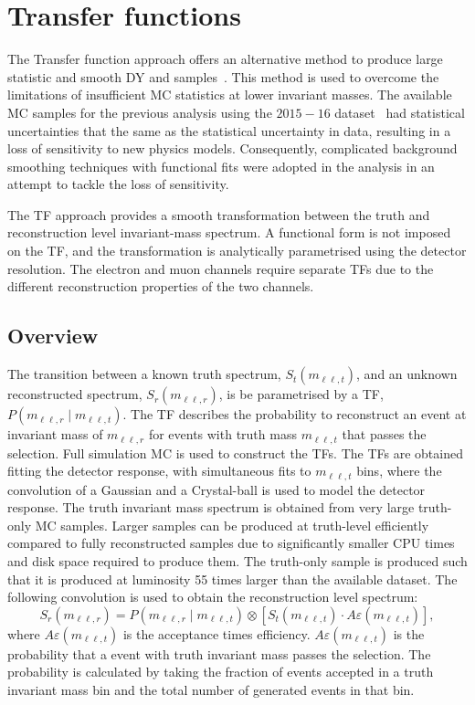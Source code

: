 \section{Transfer functions}\label{sec:datamc:transfer}
The Transfer function approach offers an alternative method to produce large statistic and smooth DY and \ttbar samples~\cite{Aad:2019fac}. This method is used to overcome the limitations of insufficient MC statistics at lower invariant masses. The available MC samples for the previous analysis using the $2015-16$ dataset~\cite{EXOT-2016-05} had statistical uncertainties that the same as the statistical uncertainty in data, resulting in a loss of sensitivity to new physics models. Consequently, complicated background smoothing techniques with functional fits were adopted in the analysis in an attempt to tackle the loss of sensitivity.

The TF approach provides a smooth transformation between the truth and reconstruction level invariant-mass spectrum. A functional form is not imposed on the TF, and the transformation is analytically parametrised using the detector resolution. The electron and muon channels require separate TFs due to the different reconstruction properties of the two channels.

\subsection{Overview}
The transition between a known truth spectrum, $S_t(m_{\ell\ell,t})$, and an unknown reconstructed spectrum, $S_r(m_{\ell\ell,r})$, is be parametrised by a TF, $P(m_{\ell\ell,r} \mid m_{\ell\ell,t})$. The TF describes the probability to reconstruct an event at invariant mass of $m_{\ell\ell,r}$ for events with truth mass $m_{\ell\ell,t}$ that passes the selection. Full simulation MC is used to construct the TFs. The TFs are obtained fitting the detector response, with simultaneous fits to $m_{\ell\ell,t}$ bins, where the convolution of a Gaussian and a Crystal-ball is used to model the detector response. The truth invariant mass spectrum is obtained from very large truth-only MC samples. Larger samples can be produced at truth-level efficiently compared to fully reconstructed samples due to significantly smaller CPU times and disk space required to produce them. The truth-only sample is produced such that it is produced at luminosity 55 times larger than the available dataset. The following convolution is used to obtain the reconstruction level spectrum: 
\begin{equation}\label{eq:TF_generalConv}
	S_r(m_{\ell\ell,r}) = P(m_{\ell\ell,r} \mid m_{\ell\ell,t}) \otimes \left[ S_t(m_{\ell\ell,t}) \cdot A\varepsilon(m_{\ell\ell,t}) \right], 
\end{equation}
where $A\varepsilon(m_{\ell\ell,t})$ is the acceptance times efficiency. $A\varepsilon(m_{\ell\ell,t})$ is the probability that a event with truth invariant mass passes the selection. The probability is calculated by taking the fraction of events accepted in a truth invariant mass bin and the total number of generated events in that bin. 

